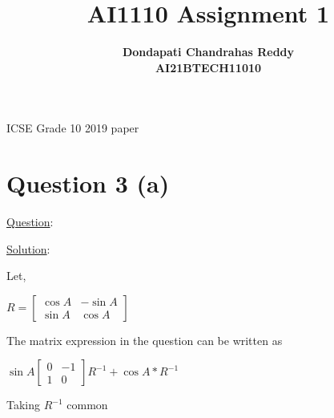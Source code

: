 \documentclass{article}
\begin{document}
\title{\textbf{AI1110 Assignment 1} }
\author{\textbf{Dondapati Chandrahas Reddy}\\\textbf{AI21BTECH11010}}
\maketitle
\begin{center}
{\Large ICSE Grade 10 2019 paper}\end{center}\par
{\Large \section{Question 3 (a) }}{\Large \underline{Question}:}


\begin{center}
\setlength \fboxrule {0in}
\setlength \fboxsep {0.1in}
\end{center}\par

{\Large \underline{Solution}: \newline\newline }\par
Let,
\begin{center}$R =\left [\begin{array}{cc}\cos A &  -\sin A \\
\sin A & \cos A\end{array}\right ]$\newline\end{center}\par

The matrix expression in the question can be written as

\begin{center}
$\sin A\left [\begin{array}{cc}0 &  -1 \\
1 & 0\end{array}\right ]R^{ -1} +\cos A \ast R^{ -1}$\newline 
\end{center}\par

Taking $R^{ -1}$ common
\end{document}
